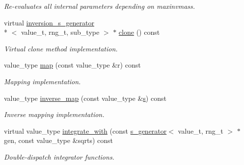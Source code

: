\begin{DoxyCompactItemize}
\begin{DoxyCompactList}\small\item\em Re-\/evaluates all internal parameters depending on maxinvmass. \end{DoxyCompactList}\item 
\hypertarget{a00317_a305736972436ab42cc7f8faf3129e887}{virtual \hyperlink{a00317}{inversion\-\_\-s\-\_\-generator}\\*
$<$ value\-\_\-t, rng\-\_\-t, sub\-\_\-type $>$ $\ast$ \hyperlink{a00317_a305736972436ab42cc7f8faf3129e887}{clone} () const }\label{a00317_a305736972436ab42cc7f8faf3129e887}

\begin{DoxyCompactList}\small\item\em Virtual clone method implementation. \end{DoxyCompactList}\item 
\hypertarget{a00317_a8ec01b69ab321ea6b9a4edc5264033c4}{value\-\_\-type \hyperlink{a00317_a8ec01b69ab321ea6b9a4edc5264033c4}{map} (const value\-\_\-type \&r) const }\label{a00317_a8ec01b69ab321ea6b9a4edc5264033c4}

\begin{DoxyCompactList}\small\item\em Mapping implementation. \end{DoxyCompactList}\item 
\hypertarget{a00317_af0b515a7177a81974f127366234c53fa}{value\-\_\-type \hyperlink{a00317_af0b515a7177a81974f127366234c53fa}{inverse\-\_\-map} (const value\-\_\-type \&\hyperlink{a00482_a8bf50336c0da12a27a71eb1154a7012e}{s}) const }\label{a00317_af0b515a7177a81974f127366234c53fa}

\begin{DoxyCompactList}\small\item\em Inverse mapping implementation. \end{DoxyCompactList}\item 
\hypertarget{a00317_a67c65807ebda0ffc0fa732a7b231aef3}{virtual value\-\_\-type \hyperlink{a00317_a67c65807ebda0ffc0fa732a7b231aef3}{integrate\-\_\-with} (const \hyperlink{a00482}{s\-\_\-generator}$<$ value\-\_\-t, rng\-\_\-t $>$ $\ast$gen, const value\-\_\-type \&sqrts) const }\label{a00317_a67c65807ebda0ffc0fa732a7b231aef3}

\begin{DoxyCompactList}\small\item\em Double-\/dispatch integrator functions. \end{DoxyCompactList}\end{DoxyCompactItemize}
